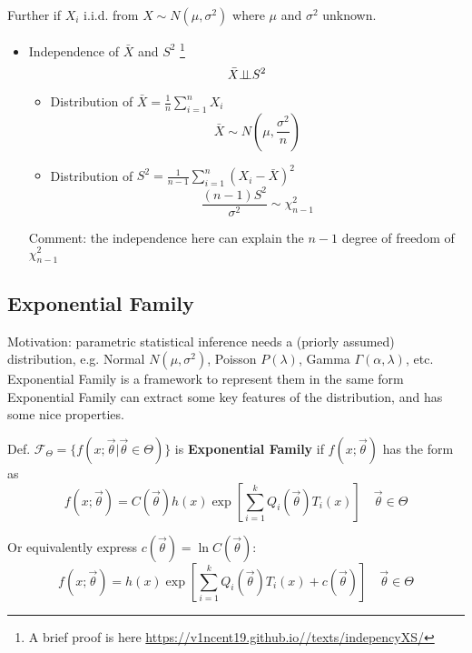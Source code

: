     Further if $X_i$ i.i.d. from $X\sim N(\mu,\sigma^2)$ where $\mu$ and $\sigma^2$ unknown.
    \begin{itemize}
        \item Independence of $\bar{X}$ and $S^2$ \footnote{A brief proof is here \url{https://v1ncent19.github.io//texts/indepencyXS/}}
            \begin{equation}
            \bar{X}\bot\!\!\!\bot S^2
            \end{equation}
        \begin{itemize}[topsep=6pt,itemsep=4pt]
        \item Distribution of $\bar{X}={\displaystyle\frac{1}{n}\sum_{i=1}^n X_i}$
        \begin{equation}\bar{X}\sim N(\mu,\frac{\sigma^2}{n})\end{equation}
        \item Distribution of $S^2={\displaystyle\frac{1}{n-1}\sum_{i=1}^n(X_i-\bar{X})^2}$
        \begin{equation}\frac{(n-1)S^2}{\sigma^2}\sim\chi^2_{n-1}\end{equation}
        \end{itemize}     
        Comment: the independence here can explain the $ n-1 $ degree of freedom of $ \chi^2_{n-1} $   
    \end{itemize}

\subsection{Exponential Family}\label{SubSectionExponentialFamily}

Motivation: parametric statistical inference needs a (priorly assumed) distribution, e.g. Normal $ N(\mu ,\sigma ^2) $, Poisson $ P(\lambda ) $, Gamma $ \Gamma (\alpha ,\lambda ) $, etc. Exponential Family is a framework to represent them in the same form Exponential Family can extract some key features of the distribution, and has some nice properties.

Def. $\mathscr{F}_\Theta=\{f(x;\vec{\theta}|\vec{\theta}\in\Theta)\}$ is \textbf{Exponential Family} if $f(x;\vec{\theta})$ has the form as
\begin{equation}
    f(x;\vec{\theta})=C(\vec{\theta})h(x)\exp \left[  \sum_{i=1}^k Q_i(\vec{\theta})T_i(x) \right]\quad\vec{\theta}\in\Theta
\end{equation}    

    Or equivalently express $ c(\vec{\theta })=\ln C(\vec{\theta }) $:
\begin{equation}
    f(x;\vec{\theta})=h(x)\exp \left[  \sum_{i=1}^k Q_i(\vec{\theta})T_i(x) +c(\vec{\theta }) \right]\quad\vec{\theta}\in\Theta
\end{equation}   

